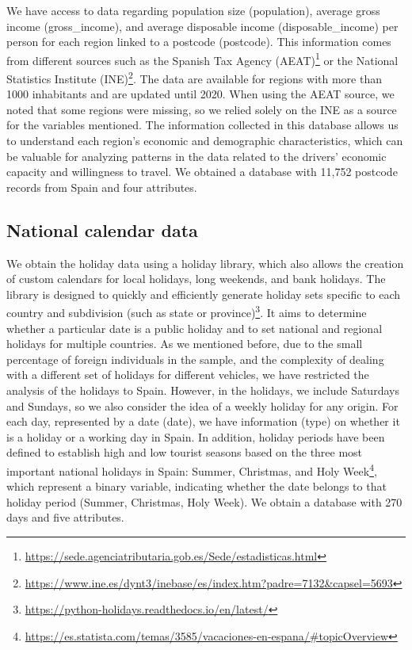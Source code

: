 We have access to data regarding population size (population), average gross income (gross\_income), and average disposable income (disposable\_income) per person for each region linked to a postcode (postcode). This information comes from different sources such as the Spanish Tax Agency (AEAT)\footnote{\url{https://sede.agenciatributaria.gob.es/Sede/estadisticas.html}} or the National Statistics Institute (INE)\footnote{\url{https://www.ine.es/dynt3/inebase/es/index.htm?padre=7132\&capsel=5693}}. The data are available for regions with more than 1000 inhabitants and are updated until 2020. When using the AEAT source, we noted that some regions were missing, so we relied solely on the INE as a source for the variables mentioned.  The information collected in this database allows us to understand each region's economic and demographic characteristics, which can be valuable for analyzing patterns in the data related to the drivers' economic capacity and willingness to travel. We obtained a database with 11,752 postcode records from Spain and four attributes. 

\subsection*{National calendar data}

We obtain the holiday data using  a holiday library, which also allows the creation of custom calendars for local holidays, long weekends, and bank holidays. The library is designed to quickly and efficiently generate holiday sets specific to each country and subdivision (such as state or province)\footnote{\url{https://python-holidays.readthedocs.io/en/latest/}}. It aims to determine whether a particular date is a public holiday and to set national and regional holidays for multiple countries. As we mentioned before, due to the small percentage of foreign individuals in the sample, and the complexity of dealing with a different set of holidays for different vehicles, we have restricted the analysis of the holidays to Spain. However, in the holidays, we include Saturdays and Sundays, so we also consider the idea of a weekly holiday for any origin. For each day, represented by a date (date), we have information (type) on whether it is a holiday or a working day in Spain. In addition, holiday periods have been defined to establish high and low tourist seasons based on the three most important national holidays in Spain: Summer, Christmas, and Holy Week\footnote{\url{https://es.statista.com/temas/3585/vacaciones-en-espana/\#topicOverview}}, which represent a binary variable, indicating whether the date belongs to that holiday period (Summer, Christmas, Holy Week). We obtain a database with 270 days and five attributes.

